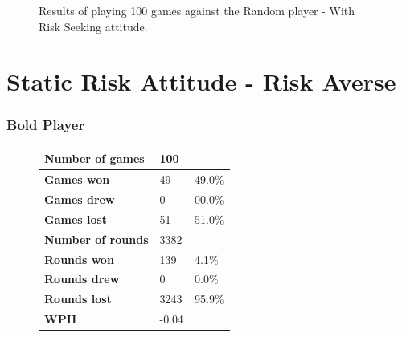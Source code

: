 \begin{figure}[H]
\begin{minipage}{\textwidth}
\begin{minipage}{0.5\textwidth}
        \end{minipage}
    \end{minipage}
    \caption{Results of playing 100 games against the Random player - With Risk Seeking attitude.}
    \label{fig:results_seeking_random}
\end{figure}



\section{Static Risk Attitude - Risk Averse}
\subsubsection{Bold Player}
\begin{figure}[H]
    \centering
    \begin{minipage}{\textwidth}
        \begin{minipage}{0.40\textwidth}
            \begin{tabular}{|l|l|l|}
                \hline
                \textbf{Number of games}  & 100   &        \\ \hline
                \textbf{Games won}        & 49    & 49.0\% \\ \hline
                \textbf{Games drew}       & 0     & 00.0\%  \\ \hline
                \textbf{Games lost}       & 51    & 51.0\% \\ \hline
                \textbf{Number of rounds} & 3382  &        \\ \hline
                \textbf{Rounds won}       & 139   & 4.1\%  \\ \hline
                \textbf{Rounds drew}      & 0     & 0.0\%  \\ \hline
                \textbf{Rounds lost}      & 3243  & 95.9\% \\ \hline
                \textbf{WPH}              & -0.04 &        \\ \hline
            \end{tabular}
        \end{minipage}
        \hspace{0.05\textwidth}
        \begin{minipage}{0.5\textwidth}

\end{minipage}
\end{minipage}
\end{figure}
